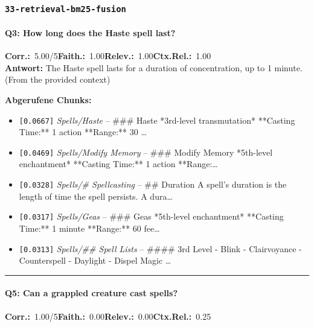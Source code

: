 \subsubsection*{\texttt{33-retrieval-bm25-fusion}}
\label{app:samples:33_retrieval_bm25_fusion}

\paragraph{Q3: How long does the Haste spell last?}
\noindent \textbf{Corr.:}~5.00/5\quad \textbf{Faith.:}~1.00\quad \textbf{Relev.:}~1.00\quad \textbf{Ctx.Rel.:}~1.00\\

\noindent\textbf{Antwort:} The Haste spell lasts for a duration of concentration, up to 1 minute. (From the provided context)

\noindent\textbf{Abgerufene Chunks:}
\begin{itemize}[noitemsep, topsep=2pt]
  \item[\textbf{\#1}] \texttt{[0.0667]} \textit{Spells/Haste} -- \#\#\# Haste  *3rd-level transmutation*  **Casting Time:** 1 action  **Range:** 30 \ldots
  \item[\textbf{\#2}] \texttt{[0.0469]} \textit{Spells/Modify Memory} -- \#\#\# Modify Memory  *5th-level enchantment*  **Casting Time:** 1 action  **Range:\ldots
  \item[\textbf{\#3}] \texttt{[0.0328]} \textit{Spells/# Spellcasting} -- \#\# Duration  A spell's duration is the length of time the spell persists. A dura\ldots
  \item[\textbf{\#4}] \texttt{[0.0317]} \textit{Spells/Geas} -- \#\#\# Geas  *5th-level enchantment*  **Casting Time:** 1 minute  **Range:** 60 fee\ldots
  \item[\textbf{\#5}] \texttt{[0.0313]} \textit{Spells/## Spell Lists} -- \#\#\#\# 3rd Level  - Blink - Clairvoyance - Counterspell - Daylight - Dispel Magic \ldots
\end{itemize}
\vspace{4pt}
\hrule
\vspace{6pt}

\paragraph{Q5: Can a grappled creature cast spells?}
\noindent \textbf{Corr.:}~1.00/5\quad \textbf{Faith.:}~0.00\quad \textbf{Relev.:}~0.00\quad \textbf{Ctx.Rel.:}~0.25\\

